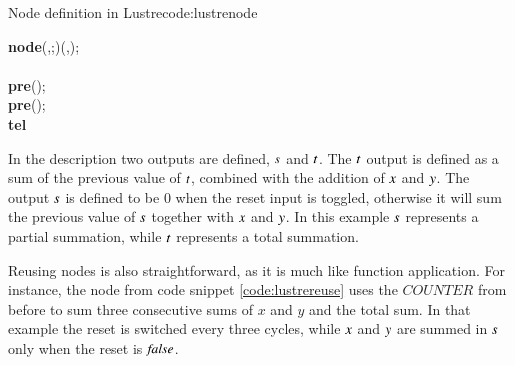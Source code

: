 \begin{texexptitled}{Node definition in Lustre}{code:lustrenode}
\begin{hscode}\SaveRestoreHook
{}%
%
%
\>[B]{}\textbf{node}\;\;(,\mathbin{:};\mathbin{:})\;\;(,\mathbin{:});{}\<[E]%
\\
\>[B]{}\<[E]%
\\
\>[B]{}\<[5]%
\>[5]{}\mathrel{=}\to {}\;\;\;\;\;\textbf{pre}\;()\mathbin{+}\mathbin{+};{}\<[E]%
\\
\>[B]{}\<[5]%
\>[5]{}\mathrel{=}\to \textbf{pre}\;()\mathbin{+}\mathbin{+};{}\<[E]%
\\
\>[B]{}\textbf{tel}{}\<[E]%
\ColumnHook
\end{hscode}\resethooks
\end{texexptitled}

In the description two outputs are defined, \ensuremath{\Varid{s}} and \ensuremath{\Varid{t}}. The \ensuremath{\Varid{t}} output is defined as a sum of the previous value of \ensuremath{\Varid{t}}, combined with the addition of \ensuremath{\Varid{x}} and \ensuremath{\Varid{y}}.
The output \ensuremath{\Varid{s}} is defined to be \ensuremath{\mathrm{0}} when the reset input is toggled, otherwise it will sum the previous value of \ensuremath{\Varid{s}} together with \ensuremath{\Varid{x}} and \ensuremath{\Varid{y}}. 
In this example \ensuremath{\Varid{s}} represents a partial summation, while \ensuremath{\Varid{t}} represents a total summation.

Reusing nodes is also straightforward, as it is much like function application. 
For instance, the node from code snippet \ref{code:lustrereuse} uses the $COUNTER$ from before to sum three consecutive sums of $x$ and $y$ and the total sum. 
In that example the reset is switched every three cycles, while \ensuremath{\Varid{x}} and \ensuremath{\Varid{y}} are summed in \ensuremath{\Varid{s}} only when the reset is \ensuremath{\Varid{false}}.

